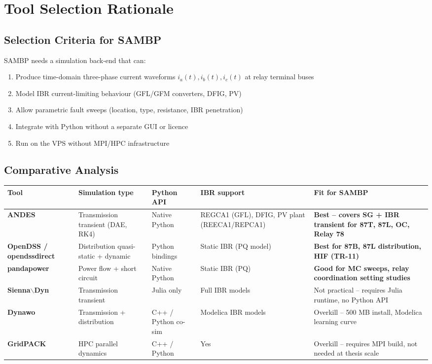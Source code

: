 \documentclass[11pt,a4paper]{article}
\begin{document}
\section{Tool Selection Rationale}

\subsection{Selection Criteria for SAMBP}

SAMBP needs a simulation back-end that can:
\begin{enumerate}[noitemsep]
\item Produce time-domain three-phase current waveforms \(i_a(t), i_b(t), i_c(t)\) at relay terminal buses
\item Model IBR current-limiting behaviour (GFL/GFM converters, DFIG, PV)
\item Allow parametric fault sweeps (location, type, resistance, IBR penetration)
\item Integrate with Python without a separate GUI or licence
\item Run on the VPS without MPI/HPC infrastructure
\end{enumerate}

\subsection{Comparative Analysis}

\begin{longtable}{p{2.2cm}p{2.4cm}p{1.8cm}p{2.8cm}p{2.8cm}}
\toprule
\textbf{Tool} & \textbf{Simulation type} & \textbf{Python API} & \textbf{IBR support} & \textbf{Fit for SAMBP} \\
\midrule
\endhead
\textbf{ANDES}
  & Transmission transient (DAE, RK4)
  & Native Python
  & REGCA1 (GFL), DFIG, PV plant (REECA1/REPCA1)
  & \textbf{Best -- covers SG + IBR transient for 87T, 87L, OC, Relay 78} \\[6pt]
\textbf{OpenDSS / opendssdirect}
  & Distribution quasi-static + dynamic
  & Python bindings
  & Static IBR (PQ model)
  & \textbf{Best for 87B, 87L distribution, HIF (TR-11)} \\[6pt]
\textbf{pandapower}
  & Power flow + short circuit
  & Native Python
  & Static IBR (PQ)
  & \textbf{Good for MC sweeps, relay coordination setting studies} \\[6pt]
\textbf{Sienna$\backslash$Dyn}
  & Transmission transient
  & Julia only
  & Full IBR models
  & Not practical -- requires Julia runtime, no Python API \\[6pt]
\textbf{Dynawo}
  & Transmission + distribution
  & C++ / Python co-sim
  & Modelica IBR models
  & Overkill -- 500 MB install, Modelica learning curve \\[6pt]
\textbf{GridPACK}
  & HPC parallel dynamics
  & C++ / Python
  & Yes
  & Overkill -- requires MPI build, not needed at thesis scale \\
\bottomrule
\end{longtable}
\end{document}

